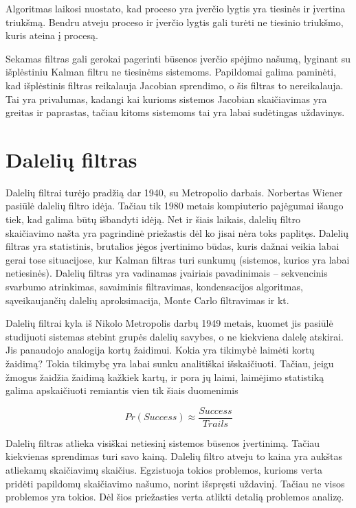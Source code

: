 \documentclass[12pt, a4paper, lithuanian]{article}
\begin{document}
    Algoritmas laikosi nuostato, kad proceso yra įverčio lygtis yra tiesinės ir įvertina triukšmą.
    Bendru atveju proceso ir įverčio lygtis gali turėti ne tiesinio triukšmo, kuris ateina į procesą.

    Sekamas filtras gali gerokai pagerinti būsenos įverčio spėjimo našumą, lyginant su išplėstiniu Kalman filtru ne tiesinėms sistemoms.
    Papildomai galima paminėti, kad išplėstinis filtras reikalauja Jacobian sprendimo, o šis filtras to nereikalauja.
    Tai yra privalumas, kadangi kai kurioms sistemos Jacobian skaičiavimas yra greitas ir paprastas, tačiau kitoms sistemoms tai yra labai sudėtingas uždavinys.

    \section{Dalelių filtras}

    Dalelių filtrai turėjo pradžią dar 1940, su Metropolio darbais.
    Norbertas Wiener pasiūlė dalelių filtro idėja.
    Tačiau tik 1980 metais kompiuterio pajėgumai išaugo tiek, kad galima būtų išbandyti idėją.
    Net ir šiais laikais, dalelių filtro skaičiavimo našta yra pagrindinė priežastis dėl ko jisai nėra toks paplitęs.
    Dalelių filtras yra statistinis, brutalios jėgos įvertinimo būdas, kuris dažnai veikia labai gerai tose situacijose, kur Kalman filtras turi sunkumų (sistemos, kurios yra labai netiesinės).
    Dalelių filtras yra vadinamas įvairiais pavadinimais -- sekvencinis svarbumo atrinkimas, savaiminis filtravimas, kondensacijos algoritmas, sąveikaujančių dalelių aproksimacija, Monte Carlo filtravimas ir kt.

    Dalelių filtrai kyla iš Nikolo Metropolis darbų 1949 metais, kuomet jis pasiūlė studijuoti sistemas stebint grupės dalelių savybes, o ne kiekviena dalelę atskirai.
    Jis panaudojo analogija kortų žaidimui.
    Kokia yra tikimybė laimėti kortų žaidimą?
    Tokia tikimybę yra labai sunku analitiškai išskaičiuoti.
    Tačiau, jeigu žmogus žaidžia žaidimą kažkiek kartų, ir pora jų laimi, laimėjimo statistiką galima apskaičiuoti remiantis vien tik šiais duomenimis

    \begin{equation}
        Pr(Success) \approx \frac{Success}{Trails}
    \end{equation}

    Dalelių filtras atlieka visiškai netiesinį sistemos būsenos įvertinimą.
    Tačiau kiekvienas sprendimas turi savo kainą.
    Dalelių filtro atveju to kaina yra aukštas atliekamų skaičiavimų skaičius.
    Egzistuoja tokios problemos, kurioms verta pridėti papildomų skaičiavimo našumo, norint išspręsti uždavinį.
    Tačiau ne visos problemos yra tokios.
    Dėl šios priežasties verta atlikti detalią problemos analizę.
\end{document}
